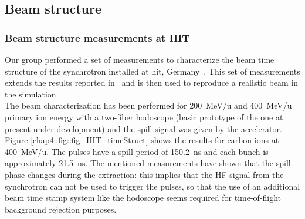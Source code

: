 \begin{table}
\centering
\caption{Hadronic models used in the Geant4 simulations.}
\label{chap4::tab::physlist_ion}
\end{table}


\subsection{Beam structure}\label{chap4::subsec::BeamModeling}
\subsubsection{Beam structure measurements at HIT}\label{chap4::subsubsec::beam_measurement}
Our group performed a set of measurements to characterize the beam time structure of the synchrotron installed at \gls{hit}, Germany~\parencite{Peters2008}. This set of measurements extends the results reported in~\cite{Peters2008} and is then used to reproduce a realistic beam in the simulation.\\
The beam characterization has been performed for 200~MeV/u and 400~MeV/u primary ion energy with a two-fiber hodoscope (basic prototype of the one at present under development) and the spill signal was given by the accelerator. Figure \ref{chap4::fig::fig_HIT_timeStruct} shows the results for carbon ions at 400~MeV/u. The pulses have a spill period of 150.2~ns and each bunch is approximately 21.5~ns.
The mentioned measurements have shown that the spill phase changes during the extraction: this implies that the HF signal from the synchrotron can not be used to trigger the pulses, so that the use of an additional beam time stamp system like the hodoscope seems required for time-of-flight background rejection purposes.

